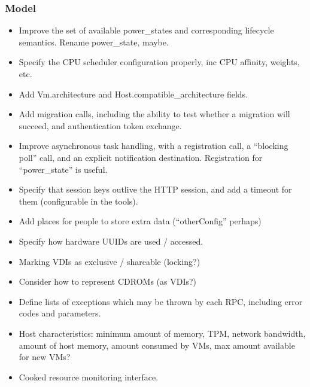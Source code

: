 \subsubsection{Model}

\begin{itemize}

\item Improve the set of available power\_states and corresponding lifecycle
semantics.  Rename power\_state, maybe.

\item Specify the CPU scheduler configuration properly, inc CPU affinity,
weights, etc.

\item Add Vm.architecture and Host.compatible\_architecture fields.

\item Add migration calls, including the ability to test whether a migration
will succeed, and authentication token exchange.

\item Improve asynchronous task handling, with a registration call, a
``blocking poll'' call, and an explicit notification destination.  Registration
for ``power\_state'' is useful.

\item Specify that session keys outlive the HTTP session, and add a timeout
for them (configurable in the tools).

\item Add places for people to store extra data (``otherConfig'' perhaps)

\item Specify how hardware UUIDs are used / accessed.

\item Marking VDIs as exclusive / shareable (locking?)

\item Consider how to represent CDROMs (as VDIs?)

\item Define lists of exceptions which may be thrown by each RPC, including
error codes and parameters.

\item Host characteristics: minimum amount of memory, TPM, network bandwidth,
amount of host memory, amount consumed by VMs, max amount available for new
VMs?

\item Cooked resource monitoring interface.


\end{itemize}
